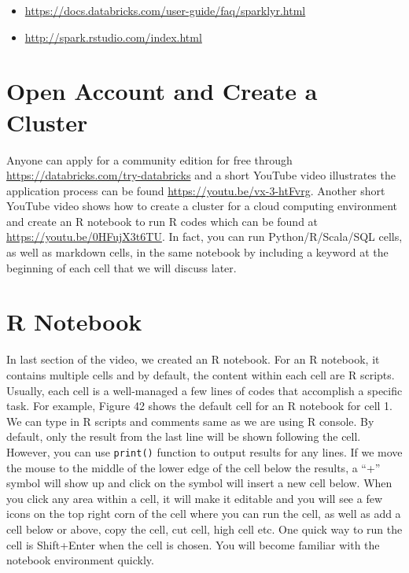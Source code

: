 \documentclass[]{book}
\providecommand{\tightlist}{%
  \setlength{\itemsep}{0pt}\setlength{\parskip}{0pt}}
\theoremstyle{definition}
\theoremstyle{definition}
\theoremstyle{remark}
\begin{document}
\begin{itemize}
\tightlist
\item
  \url{https://docs.databricks.com/user-guide/faq/sparklyr.html}
\item
  \url{http://spark.rstudio.com/index.html}
\end{itemize}

\section{Open Account and Create a
Cluster}\label{open-account-and-create-a-cluster}

Anyone can apply for a community edition for free through
\url{https://databricks.com/try-databricks} and a short YouTube video
illustrates the application process can be found
\url{https://youtu.be/vx-3-htFvrg}. Another short YouTube video shows
how to create a cluster for a cloud computing environment and create an
R notebook to run R codes which can be found at
\url{https://youtu.be/0HFujX3t6TU}. In fact, you can run
Python/R/Scala/SQL cells, as well as markdown cells, in the same
notebook by including a keyword at the beginning of each cell that we
will discuss later.

\section{R Notebook}\label{r-notebook}

In last section of the video, we created an R notebook. For an R
notebook, it contains multiple cells and by default, the content within
each cell are R scripts. Usually, each cell is a well-managed a few
lines of codes that accomplish a specific task. For example, Figure 42
shows the default cell for an R notebook for cell 1. We can type in R
scripts and comments same as we are using R console. By default, only
the result from the last line will be shown following the cell. However,
you can use \texttt{print()} function to output results for any lines.
If we move the mouse to the middle of the lower edge of the cell below
the results, a ``+'' symbol will show up and click on the symbol will
insert a new cell below. When you click any area within a cell, it will
make it editable and you will see a few icons on the top right corn of
the cell where you can run the cell, as well as add a cell below or
above, copy the cell, cut cell, high cell etc. One quick way to run the
cell is Shift+Enter when the cell is chosen. You will become familiar
with the notebook environment quickly.
\end{document}
